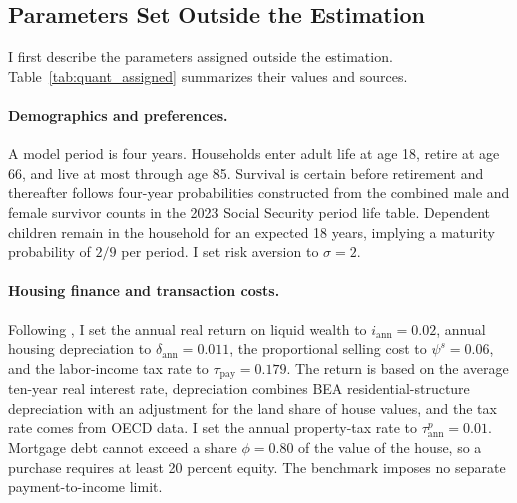 \documentclass[11pt]{article}
\theoremstyle{definition}
\newcommand{\1}{\mathbf 1}
\begin{document}
\subsection{Parameters Set Outside the Estimation}

I first describe the parameters assigned outside the estimation. Table~\ref{tab:quant_assigned}
summarizes their values and sources.

\paragraph{Demographics and preferences.}
A model period is four years. Households enter adult life at age 18, retire at
age 66, and live at most through age 85. Survival is certain before retirement
and thereafter follows four-year probabilities constructed from the combined
male and female survivor counts in the 2023 Social Security period life table.
Dependent children remain in the household for an expected 18 years, implying
a maturity probability of $2/9$ per period. I set risk aversion to $\sigma=2$.

\paragraph{Housing finance and transaction costs.}
Following \citet{greaneyDynamicUrbanEconomics2025}, I set the annual real
return on liquid wealth to $i_{\mathrm{ann}}=0.02$, annual housing depreciation
to $\delta_{\mathrm{ann}}=0.011$, the proportional selling cost to
$\psi^s=0.06$, and the labor-income tax rate to
$\tau_{\mathrm{pay}}=0.179$. The return is based on the average ten-year real
interest rate, depreciation combines BEA residential-structure depreciation
with an adjustment for the land share of house values, and the tax rate comes
from OECD data. I set the annual property-tax rate to
$\tau^p_{\mathrm{ann}}=0.01$. Mortgage debt cannot exceed a share $\phi=0.80$
of the value of the house, so a purchase requires at least 20 percent equity.
The benchmark imposes no separate payment-to-income limit.
\end{document}
